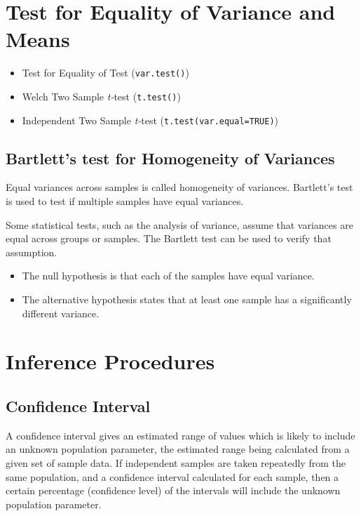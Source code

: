 



\section{Test for Equality of Variance and Means}

\begin{itemize}
\item Test for Equality of Test (\texttt{var.test()})
\item Welch Two Sample \emph{t-}test (\texttt{t.test()})
\item Independent Two Sample \emph{t-}test (\texttt{t.test(var.equal=TRUE)})

\end{itemize}

\subsection{Bartlett's test for Homogeneity of Variances}
 

Equal variances across samples is called homogeneity of variances. Bartlett's test is used to test if multiple samples have equal variances. 

Some statistical tests, such as the analysis of variance, assume that variances are equal across groups or samples.  The Bartlett test can be used to verify that assumption.

\begin{itemize}
\item The null hypothesis is that each of the samples have equal variance.
\item The alternative hypothesis states that at least one sample has a significantly different variance.
\end{itemize}

\newpage

\section{Inference Procedures}
\subsection{Confidence Interval }
A confidence interval gives an estimated range of values which is likely to include an unknown population parameter, the estimated range being calculated from a given set of sample data. If independent samples are taken repeatedly from the same population, and a confidence interval calculated for each sample, then a certain percentage (confidence level) of the intervals will include the unknown population parameter. 

